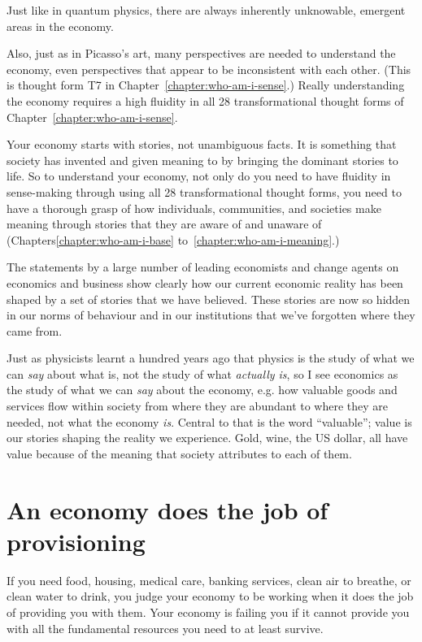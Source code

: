 Just like in quantum physics, there are always inherently unknowable, emergent areas in the economy.


Also, just as in Picasso's art, many perspectives are needed to understand the economy, even perspectives that appear to be inconsistent with each other. (This is thought form T7 in Chapter~\ref{chapter:who-am-i-sense}.) Really understanding the economy requires a high fluidity in all 28 transformational thought forms  of Chapter~\ref{chapter:who-am-i-sense}.


Your economy starts with stories, not unambiguous facts. It is something that society has invented and given meaning to by bringing the dominant stories to life. So to understand your economy, not only do you need to have fluidity in sense-making through using all 28 transformational thought forms, you need to have a thorough grasp of how individuals, communities, and societies make meaning through stories that they are aware of and unaware of (Chapters\ref{chapter:who-am-i-base} to~\ref{chapter:who-am-i-meaning}.)


The statements by a large number of leading economists and change agents on economics and business\cite{veldman-modern-economics,veldman-modern-law} show clearly how our current economic reality has been shaped by a set of stories that we have believed. These stories are now so hidden in our norms of behaviour and in our institutions that we've forgotten where they came from. 


Just as physicists learnt a hundred years ago that physics is the study of what we can \emph{say} about what is, not the study of what \emph{actually is}, so I see economics as the study of what we can \emph{say} about the economy, e.g. how valuable goods and services flow within society from where they are abundant to where they are needed, not what the economy \emph{is}. Central to that is the word “valuable”; value is our stories shaping the reality we experience. Gold, wine, the US dollar, all have value because of the meaning that society attributes to each of them.






\section{An economy does the job of provisioning}
\label{section:economy-provisioning}
If you need food, housing, medical care, banking services, clean air to breathe, or clean water to drink, you judge your economy to be working when it does the job of providing you with them. Your economy is failing you if it cannot provide you with all the fundamental resources you need to at least survive.


